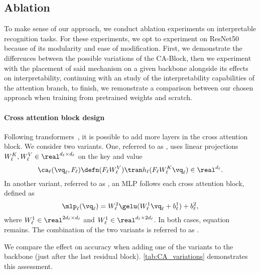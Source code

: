 \subsection{Ablation}
\label{sec:gen_ablation}

To make sense of our approach, we conduct ablation experiments on interpretable recognition tasks. For these experiments, we opt to experiment on ResNet50 because of its modularity and ease of modification. First, we demonstrate the differences between the possible variations of the CA-Block, then we experiment with the placement of said  mechanism on a given backbone alongside its effects on interpretability, continuing with an study of the interpretability capabilities of the attention branch, to finish, we remonstrate a comparison between our chosen approach when training from  pretrained weights and scratch.


\paragraph{Cross attention block design}

Following transformers~\cite{NIPS2017_3f5ee243,dosovitskiy2020image}, it is possible to add more layers in the cross attention block. We consider two variants. One, referred to as \PO, uses linear projections $W_\ell^K, W_\ell^V \in \real^{d_\ell \times d_\ell}$ on the key and value
\begin{equation}
	\ca_\ell(\vq_\ell, F_\ell) \defn (F_\ell W^V_\ell)\tran h_\ell(F_\ell W^K_\ell \vq_\ell)\in \real^{d_\ell}.
\label{eq:proj_ca}
\end{equation}
In another variant, referred to as \OM, an MLP follows each cross attention block, defined as
\begin{equation}
	\mlp_\ell(\vq_\ell) = W_\ell^2 \gelu(W_\ell^1 \vq_\ell + b_\ell^1) + b_\ell^2,
\label{eq:mlp_ca}
\end{equation}
where $W_\ell^1 \in \real^{2d_\ell \times d_\ell}$ and $W_\ell^1 \in \real^{d_\ell \times 2d_\ell}$. In both cases, equation~ remains. The combination of the two variants is referred to as \POM.


We compare the effect on accuracy when adding one of the variants to the backbone (just after the last residual block). \autoref{tab:CA_variations} demonstrates this assessment.


